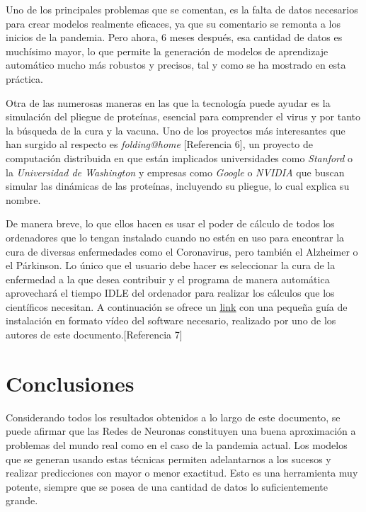 \documentclass[12pt,a4paper, xcolor=table]{article}
\begin{document}
      \vspace{1mm}

      Uno de los principales problemas que se comentan, es la falta de datos necesarios para crear modelos realmente eficaces, ya que su comentario se remonta a los inicios de la pandemia. Pero ahora, 6 meses después, esa cantidad de datos es muchísimo mayor, lo que permite la generación de modelos de aprendizaje automático mucho más robustos y precisos, tal y como se ha mostrado en esta práctica.

      \vspace{4mm}

      Otra de las numerosas maneras en las que la tecnología puede ayudar es la simulación del pliegue de proteínas, esencial para comprender el virus y por tanto la búsqueda de la cura y la vacuna. Uno de los proyectos más interesantes que han surgido al respecto es \textit{folding@home} [Referencia 6], un proyecto de computación distribuida en que están implicados universidades como \textit{Stanford} o la \textit{Universidad de Washington} y empresas como \textit{Google} o \textit{NVIDIA} que buscan simular las dinámicas de las proteínas, incluyendo su pliegue, lo cual explica su nombre.

      \vspace{2mm}

      De manera breve, lo que ellos hacen es usar el poder de cálculo de todos los ordenadores que lo tengan instalado cuando no estén en uso para encontrar la cura de diversas enfermedades como el Coronavirus, pero también el Alzheimer o el Párkinson. Lo único que el usuario debe hacer es seleccionar la cura de la enfermedad a la que desea contribuir y el programa de manera automática aprovechará el tiempo IDLE del ordenador para realizar los cálculos que los científicos necesitan. A continuación se ofrece un  \href{https://www.youtube.com/watch?v=xqvAHnac79U}{\underline{link}} con una pequeña guía de instalación en formato vídeo del software necesario, realizado por uno de los autores de este documento.[Referencia 7]



      \newpage

    \section{Conclusiones}

    Considerando todos los resultados obtenidos a lo largo de este documento, se puede afirmar que las Redes de Neuronas constituyen una buena aproximación a problemas del mundo real como en el caso de la pandemia actual. Los modelos que se generan usando estas técnicas permiten adelantarnos a los sucesos y realizar predicciones con mayor o menor exactitud. Esto es una herramienta muy potente, siempre que se posea de una cantidad de datos lo suficientemente grande.
\end{document}
